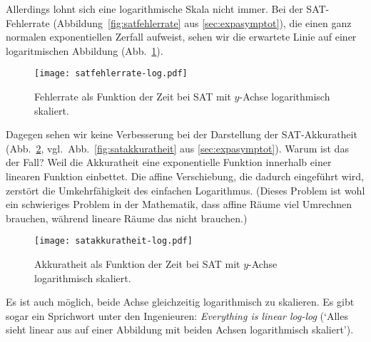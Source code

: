 \documentclass[a4paper,12pt,oneside,leqno]{scrartcl}%
\newcommand{\enquote}[1]{\frqq{}#1\flqq{}}
\newcommand{\bedeutung}[1]{`#1'}
\begin{document}
Allerdings lohnt sich eine logarithmische Skala nicht immer.  Bei der SAT-Fehlerrate (Abbildung~\ref{fig:satfehlerrate} aus \ref{sec:expasymptot}), die einen ganz normalen exponentiellen Zerfall aufweist, sehen wir die erwartete Linie auf einer logaritmischen Abbildung (Abb.~\ref{fig:satfehlerrate-log}).   
\begin{figure}[htbp]
\begin{center}
\texttt{[image: satfehlerrate-log.pdf]}
\end{center}
\caption{Fehlerrate als Funktion der Zeit bei SAT mit $y$-Achse logarithmisch skaliert.}\label{fig:satfehlerrate-log}
\end{figure}
Dagegen sehen wir keine \enquote{Verbesserung} bei der Darstellung der SAT-Akkuratheit (Abb.~\ref{fig:satakkuratheit-log}, vgl.~Abb.~\ref{fig:satakkuratheit} aus \ref{sec:expasymptot}).  
Warum ist das der Fall?  Weil die Akkuratheit eine exponentielle Funktion innerhalb einer linearen Funktion einbettet.  
Die affine Verschiebung, die dadurch eingeführt wird, zerstört die Umkehrfähigkeit des einfachen Logarithmus.  
(Dieses Problem ist wohl ein schwieriges Problem in der Mathematik, dass affine Räume viel Umrechnen brauchen, während lineare Räume das nicht brauchen.)  
\begin{figure}[htbp]
\begin{center}
\texttt{[image: satakkuratheit-log.pdf]}
\end{center}
\caption{Akkuratheit als Funktion der Zeit bei SAT mit $y$-Achse logarithmisch skaliert.}\label{fig:satakkuratheit-log}
\end{figure}

Es ist auch möglich, beide Achse gleichzeitig logarithmisch zu skalieren.  Es gibt sogar ein Sprichwort unter den Ingenieuren: \emph{Everything is linear log-log} (\bedeutung{Alles sieht linear aus auf einer Abbildung mit beiden Achsen logarithmisch skaliert}). 



\end{document}
